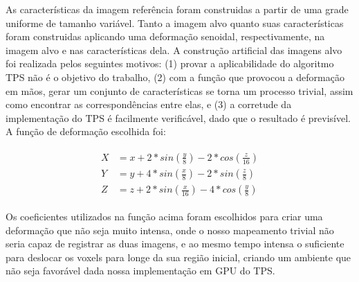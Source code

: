   As características da imagem referência foram construidas a partir de uma
grade uniforme de tamanho variável. Tanto a imagem alvo quanto suas características
foram construidas aplicando uma deformação senoidal, respectivamente, na imagem
alvo e nas características dela. A construção artificial das imagens alvo foi
realizada pelos seguintes motivos: (1) provar a aplicabilidade do algoritmo TPS
não é o objetivo do trabalho, (2) com a função que provocou a deformação em
mãos, gerar um conjunto de características se torna um processo trivial, assim
como encontrar as correspondências entre elas, e (3) a corretude
da implementação do TPS é facilmente verificável, dado que o resultado é
previsível. A função de deformação escolhida foi:

\begin{align} \label{math:composta}
\begin{split}
  X &= x + 2*sin(\frac{y}{8}) - 2*cos(\frac{z}{16}) \\
  Y &= y + 4*sin(\frac{x}{8}) - 2*sin(\frac{z}{8}) \\
  Z &= z + 2*sin(\frac{x}{16}) - 4*cos(\frac{y}{8})
\end{split}
\end{align}

  Os coeficientes utilizados na função acima foram escolhidos para criar uma
deformação que não seja muito intensa, onde o nosso mapeamento trivial não
seria capaz de registrar as duas imagens, e ao mesmo tempo intensa o suficiente
para deslocar os voxels para longe da sua região inicial, criando um ambiente
que não seja favorável dada nossa implementação em GPU do TPS.


